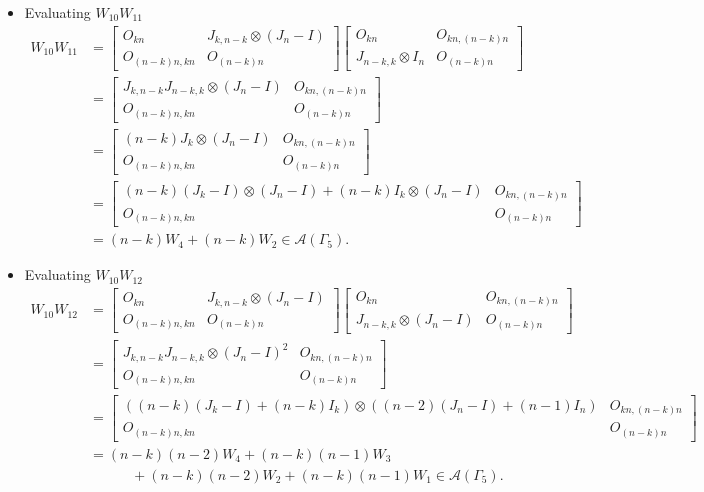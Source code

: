 \begin{itemize}
\item Evaluating $W_{10}W_{11}$
\begin{align*}
    W_{10}W_{11}
    &= \begin{bmatrix}
        O_{kn} & J_{k,n-k} \otimes (J_n-I) \\
        O_{(n-k)n,kn} & O_{(n-k)n}
    \end{bmatrix}
    \begin{bmatrix}
        O_{kn} & O_{kn, (n-k)n} \\
        J_{n-k, k}\otimes I_n & O_{(n-k)n}
    \end{bmatrix}\\
    &= \begin{bmatrix}
        J_{k,n-k}J_{n-k,k} \otimes (J_n-I) & O_{kn, (n-k)n} \\
        O_{(n-k)n,kn} & O_{(n-k)n}
    \end{bmatrix}\\
    &= \begin{bmatrix}
        (n-k)J_k\otimes (J_n-I) & O_{kn, (n-k)n} \\
        O_{(n-k)n,kn} & O_{(n-k)n}
    \end{bmatrix}\\
    &= \begin{bmatrix}
        (n-k)(J_k-I)\otimes (J_n-I) + (n-k)I_k\otimes(J_n-I) & O_{kn, (n-k)n} \\
        O_{(n-k)n,kn} & O_{(n-k)n}
    \end{bmatrix}\\
    &= (n-k)W_4 + (n-k)W_2\in\mathcal{A}(\Gamma_5).
\end{align*}

\item Evaluating $W_{10}W_{12}$
\begin{align*}
    W_{10}W_{12}
    &= \begin{bmatrix}
        O_{kn} & J_{k,n-k} \otimes (J_n-I) \\
        O_{(n-k)n,kn} & O_{(n-k)n}
    \end{bmatrix}
    \begin{bmatrix}
        O_{kn} & O_{kn, (n-k)n} \\
        J_{n-k, k}\otimes (J_n-I) & O_{(n-k)n}
    \end{bmatrix}\\
    &= \begin{bmatrix}
        J_{k,n-k}J_{n-k,k} \otimes (J_n-I)^2 & O_{kn, (n-k)n} \\
        O_{(n-k)n,kn} & O_{(n-k)n}
    \end{bmatrix}\\
    &= \begin{bmatrix}
        ((n-k)(J_k-I) + (n-k)I_k)\otimes ((n-2)(J_n-I) + (n-1)I_n) & O_{kn, (n-k)n} \\
        O_{(n-k)n,kn} & O_{(n-k)n}
    \end{bmatrix}\\
    &= (n-k)(n-2)W_4 + (n-k)(n-1)W_3 \\
    &\quad\quad\quad+ (n-k)(n-2)W_2 + (n-k)(n-1)W_1\in\mathcal{A}(\Gamma_5).
\end{align*}


\end{itemize}
